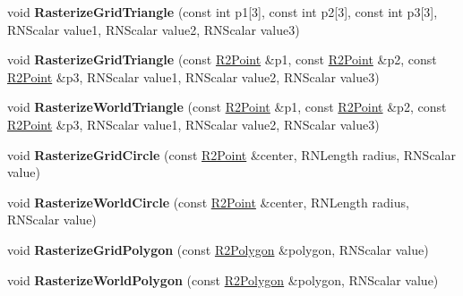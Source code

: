 \begin{DoxyCompactItemize}
\item 
void {\bfseries Rasterize\+Grid\+Triangle} (const int p1\mbox{[}3\mbox{]}, const int p2\mbox{[}3\mbox{]}, const int p3\mbox{[}3\mbox{]}, R\+N\+Scalar value1, R\+N\+Scalar value2, R\+N\+Scalar value3)\hypertarget{class_r2_grid_ad9249ac86af74c8459d47d6292ea641f}{}\label{class_r2_grid_ad9249ac86af74c8459d47d6292ea641f}

\item 
void {\bfseries Rasterize\+Grid\+Triangle} (const \hyperlink{class_r2_point}{R2\+Point} \&p1, const \hyperlink{class_r2_point}{R2\+Point} \&p2, const \hyperlink{class_r2_point}{R2\+Point} \&p3, R\+N\+Scalar value1, R\+N\+Scalar value2, R\+N\+Scalar value3)\hypertarget{class_r2_grid_aed8bf8f2826dec2b1cd46718c0dad386}{}\label{class_r2_grid_aed8bf8f2826dec2b1cd46718c0dad386}

\item 
void {\bfseries Rasterize\+World\+Triangle} (const \hyperlink{class_r2_point}{R2\+Point} \&p1, const \hyperlink{class_r2_point}{R2\+Point} \&p2, const \hyperlink{class_r2_point}{R2\+Point} \&p3, R\+N\+Scalar value1, R\+N\+Scalar value2, R\+N\+Scalar value3)\hypertarget{class_r2_grid_ac26feb4c1725d1f933b404b272870283}{}\label{class_r2_grid_ac26feb4c1725d1f933b404b272870283}

\item 
void {\bfseries Rasterize\+Grid\+Circle} (const \hyperlink{class_r2_point}{R2\+Point} \&center, R\+N\+Length radius, R\+N\+Scalar value)\hypertarget{class_r2_grid_aee09a4a0730892bfe812e01e00a19e6d}{}\label{class_r2_grid_aee09a4a0730892bfe812e01e00a19e6d}

\item 
void {\bfseries Rasterize\+World\+Circle} (const \hyperlink{class_r2_point}{R2\+Point} \&center, R\+N\+Length radius, R\+N\+Scalar value)\hypertarget{class_r2_grid_a1a11499746e25be1afe9204efcfeb3f7}{}\label{class_r2_grid_a1a11499746e25be1afe9204efcfeb3f7}

\item 
void {\bfseries Rasterize\+Grid\+Polygon} (const \hyperlink{class_r2_polygon}{R2\+Polygon} \&polygon, R\+N\+Scalar value)\hypertarget{class_r2_grid_ab57017b16e9b39a8213a878dc75b09b0}{}\label{class_r2_grid_ab57017b16e9b39a8213a878dc75b09b0}

\item 
void {\bfseries Rasterize\+World\+Polygon} (const \hyperlink{class_r2_polygon}{R2\+Polygon} \&polygon, R\+N\+Scalar value)\hypertarget{class_r2_grid_a382463ad003dba7537cc60d34455b9d0}{}\label{class_r2_grid_a382463ad003dba7537cc60d34455b9d0}


\end{DoxyCompactItemize}
